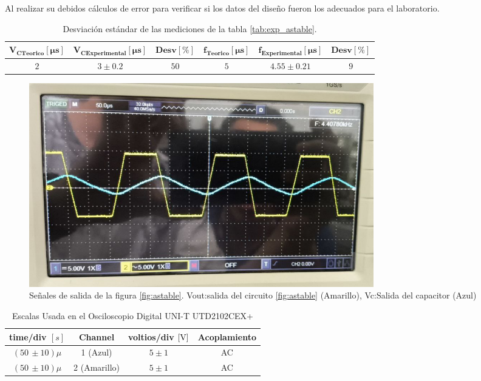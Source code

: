             Al realizar su debidos cálculos de error para verificar si los datos del diseño fueron los adecuados para el laboratorio.

            \begin{table}[H]
              \centering
              \begin{tabular}{|c|c|c|c|c|c|}
                \hline
                $\mathbf{V_{CTeorico} [\mu s]}$ & $\mathbf{V_{CExperimental}[\mu s]}$ & $\mathbf{Desv [\%]}$ & $\mathbf{f_{Teorico} [\mu s]}$ & $\mathbf{f_{Experimental}[\mu s]}$ & $\mathbf{Desv [\%]}$ \\
                \hline
                $2$ & $3 \pm 0.2$ & $50$ & $5$ & $4.55 \pm 0.21$ & $9$ \\
                \hline
              \end{tabular}
              \caption{Desviación estándar de las mediciones de la tabla \ref{tab:exp_astable}.}
              \label{tab:desv_astable}
            \end{table}

            \begin{figure}[H]
                \centering
                \renewcommand{\figurename}{Imagen}
                \includegraphics[width=15cm]{Imagenes/exp_astable_vc_vout.png}
                \caption{Señales de salida de la figura \ref{fig:astable}. Vout:salida del circuito \ref{fig:astable} (Amarillo), Vc:Salida del capacitor (Azul)}
                \label{fig:exp_astable_vc_vout}
            \end{figure}

            \begin{table}[H]
                \centering
                \begin{tabular}{|c|c|c|c|}
                    \hline
                    \textbf{time/div} $[s]$ & \textbf{Channel} & \textbf{voltios/div $[\volt]$} & \textbf{Acoplamiento} \\ \hline
                    $(50 \, \pm 10) \mu  $ & 1 (Azul)  &   $5 \pm 1   $ & AC \\ \hline  
                    $(50 \, \pm 10) \mu  $ & 2 (Amarillo)  &   $5 \pm 1   $ & AC \\ \hline  
                \end{tabular}
                \caption{Escalas Usada en el Osciloscopio Digital UNI-T UTD2102CEX+}
                \label{tab:escala_astable_vc_vout}
            \end{table}

